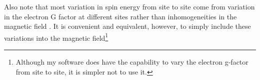 \documentclass{report}
\begin{document}
\begin{appendices}
Also note that most variation in spin energy from site to site come from variation in the electron G factor at different sites rather than inhomogeneities in the magnetic field \cite{Hwang2017}. It is convenient and equivalent, however, to simply include these variations into the magnetic field\footnote{Although my software does have the capability to vary the electron g-factor from site to site, it is simpler not to use it. }

\end{appendices}

\printbibliography
\end{document}
